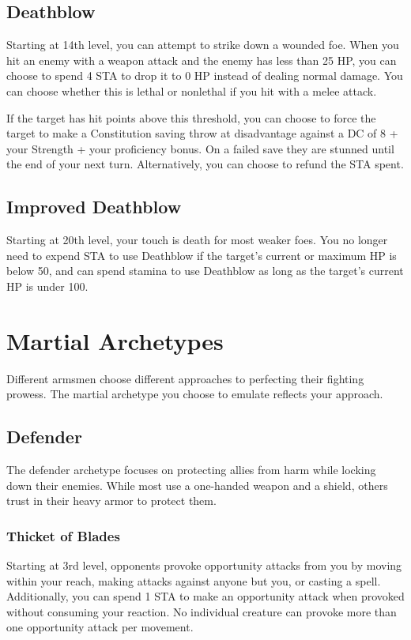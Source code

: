 \subsection{Deathblow}
Starting at 14th level, you can attempt to strike down a wounded foe. When you hit an enemy with a weapon attack and the enemy has less than 25 HP, you can choose to spend 4 STA to drop it to 0 HP instead of dealing normal damage. You can choose whether this is lethal or nonlethal if you hit with a melee attack.

If the target has hit points above this threshold, you can choose to force the target to make a Constitution saving throw at disadvantage against a DC of 8 + your Strength + your proficiency bonus. On a failed save they are stunned until the end of your next turn. Alternatively, you can choose to refund the STA spent.

\subsection{Improved Deathblow}
Starting at 20th level, your touch is death for most weaker foes. You no longer need to expend STA to use Deathblow if the target's current or maximum HP is below 50, and can spend stamina to use Deathblow as long as the target's current HP is under 100.

\section{Martial Archetypes}

Different armsmen choose different approaches to perfecting their fighting prowess. The martial archetype you choose to emulate reflects your approach.

\subsection{Defender}
The defender archetype focuses on protecting allies from harm while locking down their enemies. While most use a one-handed weapon and a shield, others trust in their heavy armor to protect them.

\subsubsection{Thicket of Blades}
Starting at 3rd level, opponents provoke opportunity attacks from you by moving within your reach, making attacks against anyone but you, or casting a spell. Additionally, you can spend 1 STA to make an opportunity attack when provoked without consuming your reaction. No individual creature can provoke more than one opportunity attack per movement. 

